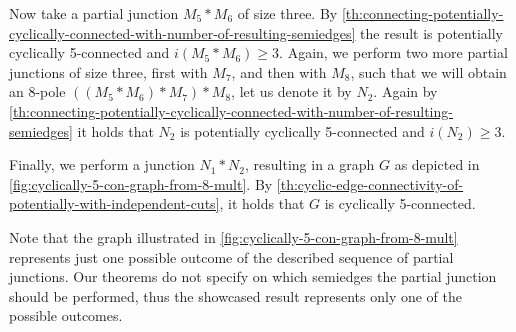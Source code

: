 \documentclass[12pt, twoside]{book}
\begin{document}
\begin{example}
	Now take a partial junction $M_5*M_6$ of size three. By \cref{th:connecting-potentially-cyclically-connected-with-number-of-resulting-semiedges} the result is potentially cyclically \mbox{5-connected} and $i(M_5*M_6)\geq 3$. Again, we perform two more partial junctions of size three, first with $M_7$, and then with $M_8$, such that we will obtain an 8-pole ${\left((M_5*M_6)*M_7\right)*M_8}$, let us denote it by $N_2$. Again by \cref{th:connecting-potentially-cyclically-connected-with-number-of-resulting-semiedges} it holds that $N_2$ is potentially cyclically 5-connected and $i(N_2)\geq 3$.
	
	Finally, we perform a junction $N_1*N_2$, resulting in a graph $G$ as depicted in \cref{fig:cyclically-5-con-graph-from-8-mult}. By \cref{th:cyclic-edge-connectivity-of-potentially-with-independent-cuts}, it holds that $G$ is cyclically 5-connected.
	
	Note that the graph illustrated in \cref{fig:cyclically-5-con-graph-from-8-mult} represents just one possible outcome of the described sequence of partial junctions. Our theorems do not specify on which semiedges the partial junction should be performed, thus the showcased result represents only one of the possible outcomes.
\end{example}
\end{document}
